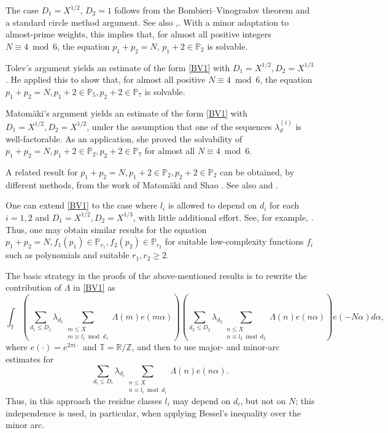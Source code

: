 \documentclass{amsart}
\theoremstyle{definition}
\theoremstyle{remark}
\newcommand{\1}{
    \bm{1}
}
\begin{document}
The case \(D_1=X^{1/2}\), \(D_2=1\) follows from the Bombieri--Vinogradov theorem and a standard circle method argument. See also \cite{kawada1993prime_ktuplets_ap},\cite{mikawa1992prime_twins_ap}. 
With a minor adaptation to almost-prime weights, this implies that, for almost all positive integers $N \equiv 4 \bmod 6$, the equation \(p_1+p_2=N\), \(p_1+2 \in \mathbb{P}_2\) is solvable. 
  

Tolev's argument \cite{tolev2000additive} yields an estimate of the form \eqref{BV1} with $D_1=X^{1/2}, D_2 = X^{1/3}$. He applied this to show that, for almost all positive $N \equiv 4 \bmod 6$, the equation $p_1+p_2=N, p_1+2 \in \mathbb{P}_5, p_2+2 \in \mathbb{P}_7$ is solvable. 


Matom{\"a}ki's argument \cite{matomaki2009bombieri} yields an estimate of the form \eqref{BV1} with $D_1=X^{1/2}, D_2 = X^{1/2}$, under the assumption that one of the sequences $\lambda^{(i)}_d$ is well-factorable. As an application, she proved the solvability of $p_1+p_2=N, p_1+2 \in \mathbb{P}_2, p_2+2 \in \mathbb{P}_7$ for almost all $N \equiv 4 \bmod 6$. 


A related result for $p_1+p_2=N, p_1+2 \in \mathbb{P}_2, p_2+2 \in \mathbb{P}_2$ can be obtained, by different methods, from the work of Matom{\"a}ki and Shao \cite{matomaki2017vinogradov}. 
See also \cite{grimmelt2025exceptional} and \cite{grimmelt2022goldbach}. 


One can extend \eqref{BV1} to the case where \(l_i\) is allowed to depend on \(d_i\) for each \(i=1,2\) and $D_1=X^{1/2}, D_2 = X^{1/3}$, with little additional effort.  See, for example, \cite[Theorem 2.1]{akeno2025small}. 
Thus, one may obtain similar results for the equation $p_1+p_2=N, f_1(p_1) \in \mathbb{P}_{r_1}, f_2(p_2) \in \mathbb{P}_{r_2}$ for suitable low-complexity functions $f_i$ such as polynomials and suitable $r_1,r_2 \geq 2$. 

The basic strategy in the proofs of the above-mentioned results is to rewrite the contribution of $\Lambda$ in \eqref{BV1} as
\[ \int_{\mathbb{T}} \left( \sum_{d_1 \leq D_1} \lambda_{d_1} \sum_{\substack{m \leq X \\ m \equiv l_1 \bmod d_1}} \Lambda(m) e(m\alpha) \right) \left( \sum_{d_2 \leq D_2} \lambda_{d_2} \sum_{\substack{n \leq X \\ n \equiv l_2 \bmod d_2}} \Lambda(n) e(n\alpha) \right) e(-N\alpha) d\alpha, \]
where $e(\cdot)=e^{2\pi i \cdot}$ and $\mathbb{T}=\mathbb{R}/\mathbb{Z}$, and then to use major- and minor-arc estimates for 
\[ \sum_{d_i \leq D_i} \lambda_{d_i} \sum_{\substack{n \leq X \\ n \equiv l_i \bmod d_i}} \Lambda(n) e(n\alpha). \]
Thus, in this approach the residue classes $l_i$ may depend on $d_i$, but not on $N$; this independence is used, in particular, when applying Bessel's inequality over the minor arc.
\end{document}
